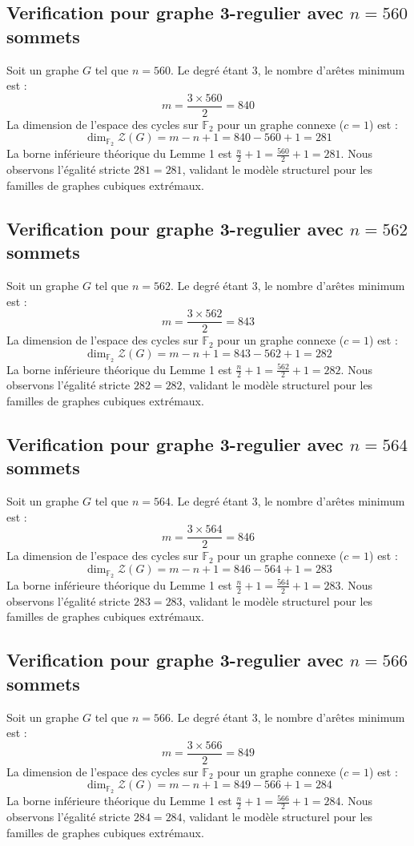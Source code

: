 \documentclass[11pt,a4paper]{article}
\begin{document}
\subsection{Verification pour graphe 3-regulier avec $n=560$ sommets}
Soit un graphe $G$ tel que $n = 560$. Le degré étant 3, le nombre d'arêtes minimum est :
$$ m = \frac{3 \times 560}{2} = 840 $$
La dimension de l'espace des cycles sur $\mathbb{F}_2$ pour un graphe connexe ($c=1$) est :
$$ \dim_{\mathbb{F}_2} \mathcal{Z}(G) = m - n + 1 = 840 - 560 + 1 = 281 $$
La borne inférieure théorique du Lemme 1 est $\frac{n}{2} + 1 = \frac{560}{2} + 1 = 281$.
Nous observons l'égalité stricte $281 = 281$, validant le modèle structurel pour les familles de graphes cubiques extrémaux.

\subsection{Verification pour graphe 3-regulier avec $n=562$ sommets}
Soit un graphe $G$ tel que $n = 562$. Le degré étant 3, le nombre d'arêtes minimum est :
$$ m = \frac{3 \times 562}{2} = 843 $$
La dimension de l'espace des cycles sur $\mathbb{F}_2$ pour un graphe connexe ($c=1$) est :
$$ \dim_{\mathbb{F}_2} \mathcal{Z}(G) = m - n + 1 = 843 - 562 + 1 = 282 $$
La borne inférieure théorique du Lemme 1 est $\frac{n}{2} + 1 = \frac{562}{2} + 1 = 282$.
Nous observons l'égalité stricte $282 = 282$, validant le modèle structurel pour les familles de graphes cubiques extrémaux.

\subsection{Verification pour graphe 3-regulier avec $n=564$ sommets}
Soit un graphe $G$ tel que $n = 564$. Le degré étant 3, le nombre d'arêtes minimum est :
$$ m = \frac{3 \times 564}{2} = 846 $$
La dimension de l'espace des cycles sur $\mathbb{F}_2$ pour un graphe connexe ($c=1$) est :
$$ \dim_{\mathbb{F}_2} \mathcal{Z}(G) = m - n + 1 = 846 - 564 + 1 = 283 $$
La borne inférieure théorique du Lemme 1 est $\frac{n}{2} + 1 = \frac{564}{2} + 1 = 283$.
Nous observons l'égalité stricte $283 = 283$, validant le modèle structurel pour les familles de graphes cubiques extrémaux.

\subsection{Verification pour graphe 3-regulier avec $n=566$ sommets}
Soit un graphe $G$ tel que $n = 566$. Le degré étant 3, le nombre d'arêtes minimum est :
$$ m = \frac{3 \times 566}{2} = 849 $$
La dimension de l'espace des cycles sur $\mathbb{F}_2$ pour un graphe connexe ($c=1$) est :
$$ \dim_{\mathbb{F}_2} \mathcal{Z}(G) = m - n + 1 = 849 - 566 + 1 = 284 $$
La borne inférieure théorique du Lemme 1 est $\frac{n}{2} + 1 = \frac{566}{2} + 1 = 284$.
Nous observons l'égalité stricte $284 = 284$, validant le modèle structurel pour les familles de graphes cubiques extrémaux.
\end{document}
